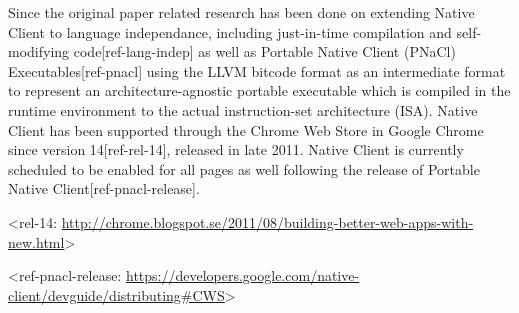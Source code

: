 Since the original paper related research has been done on extending Native
Client to language independance, including just-in-time compilation
and self-modifying code[ref-lang-indep] as well as Portable Native Client
(PNaCl) Executables[ref-pnacl] using the LLVM bitcode format as an intermediate
format to represent an architecture-agnostic portable executable which is
compiled in the runtime environment to the actual instruction-set architecture
(ISA).
Native Client has been supported through the Chrome Web Store in Google Chrome
since version 14[ref-rel-14], released in late 2011.
Native Client is currently scheduled to be enabled for all pages as well
following the release of Portable Native Client[ref-pnacl-release].

<rel-14: \url{http://chrome.blogspot.se/2011/08/building-better-web-apps-with-new.html}>

<ref-pnacl-release: \url{https://developers.google.com/native-client/devguide/distributing#CWS}>
